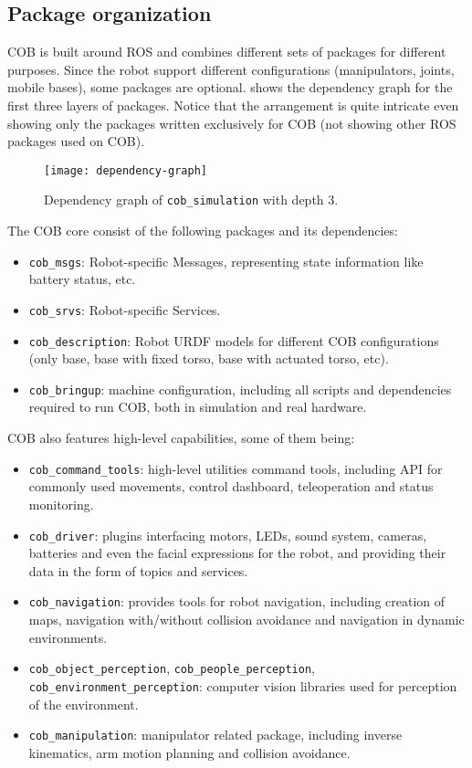 \subsection{Package organization}

COB is built around ROS and combines different sets of packages for different purposes. Since the robot support different configurations (manipulators, joints, mobile bases), some packages are optional.  shows the dependency graph for the first three layers of packages. Notice that the arrangement is quite intricate even showing only the packages written exclusively for COB (not showing other ROS packages used on COB).

\begin{figure}[!ht]
\centering
\texttt{[image: dependency-graph]}
\caption{Dependency graph of \texttt{cob\_simulation} with depth 3.}
\label{fig:dependency-graph}
\end{figure}


The COB core consist of the following packages and its dependencies:

\begin{itemize}
\item \texttt{cob\_msgs}: Robot-specific Messages, representing state information like battery status, etc.
\item \texttt{cob\_srvs}: Robot-specific Services.
\item \texttt{cob\_description}: Robot URDF models for different COB configurations (only base, base with fixed torso, base with actuated torso, etc).
\item \texttt{cob\_bringup}: machine configuration, including all scripts and dependencies required to run COB, both in simulation and real hardware.
\end{itemize}

COB also features high-level capabilities, some of them being:

\begin{itemize}
\item \texttt{cob\_command\_tools}: high-level utilities command tools, including API for commonly used movements, control dashboard, teleoperation and status monitoring.
\item \texttt{cob\_driver}: plugins interfacing motors, LEDs, sound system, cameras, batteries and even the facial expressions for the robot, and providing their data in the form of topics and services.
\item \texttt{cob\_navigation}: provides tools for robot navigation, including creation of maps, navigation with/without collision avoidance and navigation in dynamic environments.
\item \texttt{cob\_object\_perception}, \texttt{cob\_people\_perception}, \texttt{cob\_environment\_perception}: computer vision libraries used for perception of the environment.
\item \texttt{cob\_manipulation}: manipulator related package, including inverse kinematics, arm motion planning and collision avoidance.
\end{itemize}

